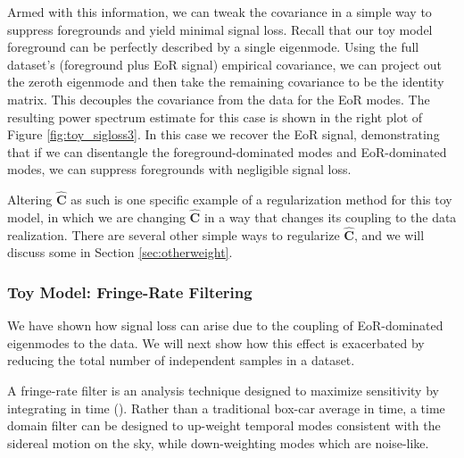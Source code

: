 \documentclass[preprint2,numberedappendix,tighten]{aastex6}  %
\begin{document}
Armed with this information,
we can tweak the covariance in a simple way to suppress foregrounds and yield minimal signal loss. Recall that our toy model foreground 
can be perfectly described by a single eigenmode. Using the full dataset's (foreground plus EoR signal) empirical covariance, we can 
project out the zeroth eigenmode and 
then take the remaining covariance to be the identity matrix.  
This decouples the covariance from the data for the EoR modes.  The resulting power spectrum estimate for this case is shown in the right plot of Figure \ref{fig:toy_sigloss3}. 
In this case we recover the EoR signal, demonstrating that if we can disentangle the foreground-dominated modes and EoR-dominated modes, we can suppress
foregrounds with negligible signal loss. 

Altering $\widehat{\textbf{C}}$ as such is one specific example of a regularization method for this toy model, in which we are changing $\widehat{\textbf{C}}$ in a way that changes its coupling to the data realization. There are several other simple ways to regularize $\widehat{\textbf{C}}$, and we will discuss some in Section 
\ref{sec:otherweight}.

\subsubsection{Toy Model: Fringe-Rate Filtering}
\label{sec:toymodel_frf}

We have shown how signal loss can arise due to the coupling of EoR-dominated eigenmodes to the data. We will next show how this effect is exacerbated by reducing the total number of independent samples in a dataset. 

A fringe-rate filter is an analysis technique designed to maximize sensitivity by integrating in time (\citealt{parsons_et_al2016}). Rather than a traditional box-car average in time, a time domain filter can be designed to up-weight temporal modes consistent with the sidereal motion on the sky, while down-weighting modes which are noise-like. 
\end{document}
